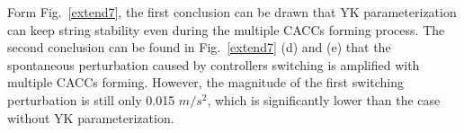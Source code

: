 \documentclass[trsc,nonblindrev]{informs3} %
\begin{document}
Form Fig.~\ref{extend7}, the first conclusion can be drawn that YK parameterization can keep string stability even during the multiple CACCs forming process. The second conclusion can be found in Fig.~\ref{extend7} (d) and (e) that the spontaneous perturbation caused by controllers switching is amplified with multiple CACCs forming. However, the magnitude of the first switching perturbation is still only 0.015 $m/s^2$, which is significantly lower than the case without YK parameterization.









\end{document}
